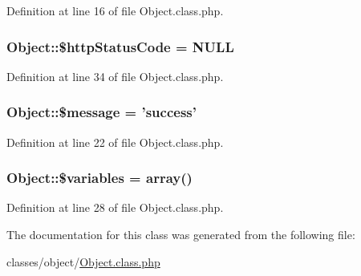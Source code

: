 Definition at line 16 of file Object.\+class.\+php.

\hypertarget{classObject_a82ad6bb41d770d91d9d10a97495669d0}{
\subsubsection[{\$http\+Status\+Code}]{\setlength{\rightskip}{0pt plus 5cm}Object\+::\$http\+Status\+Code = N\+U\+L\+L}}\label{classObject_a82ad6bb41d770d91d9d10a97495669d0}


Definition at line 34 of file Object.\+class.\+php.

\hypertarget{classObject_af661550c62873d6b6e61f32d68c56973}{
\subsubsection[{\$message}]{\setlength{\rightskip}{0pt plus 5cm}Object\+::\$message = 'success'}}\label{classObject_af661550c62873d6b6e61f32d68c56973}


Definition at line 22 of file Object.\+class.\+php.

\hypertarget{classObject_a153e76f6619408780cc2b50cef5100c6}{
\subsubsection[{\$variables}]{\setlength{\rightskip}{0pt plus 5cm}Object\+::\$variables = array()}}\label{classObject_a153e76f6619408780cc2b50cef5100c6}


Definition at line 28 of file Object.\+class.\+php.



The documentation for this class was generated from the following file\+:\begin{DoxyCompactItemize}
\item 
classes/object/\hyperlink{Object_8class_8php}{Object.\+class.\+php}\end{DoxyCompactItemize}
